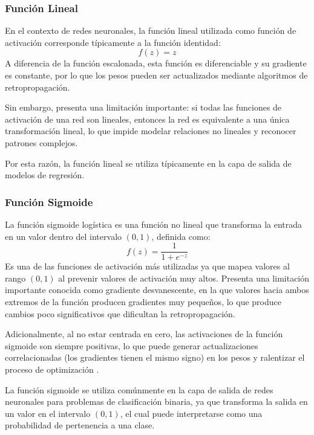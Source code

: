\subsubsection{Función Lineal}
En el contexto de redes neuronales, la función lineal utilizada como función de activación 
corresponde típicamente a la función identidad\parencite{DBLP:journals/corr/abs-2101-09957}:
\begin{equation}
    f(z) = z
\end{equation}
A diferencia de la función escalonada, esta función es diferenciable y su gradiente es 
constante, por lo que los pesos pueden ser actualizados mediante algoritmos de 
retropropagación.

Sin embargo, presenta una limitación importante: si todas las funciones de activación de 
una red son lineales, entonces la red es equivalente a una única transformación lineal, 
lo que impide modelar relaciones no lineales y reconocer patrones complejos.

Por esta razón, la función lineal se utiliza típicamente en la capa de salida de modelos 
de regresión.

\subsubsection{Función Sigmoide}
La función sigmoide logística es una función no lineal que transforma la entrada en un valor
dentro del intervalo $(0,1)$, definida como:
\begin{equation}
    f(z)=\frac{1}{1+e^{-z}}
\end{equation}
Es una de las funciones de activación más utilizadas ya que mapea valores al rango $(0,1)$
al prevenir valores de activación muy altos. Presenta una limitación importante conocida
como \guillemotleft gradiente desvanescente\guillemotright, en la que valores hacia ambos
extremos de la función producen gradientes muy pequeños, lo que produce cambios poco significativos
que dificultan la retropropagación.
\medskip

Adicionalmente, al no estar centrada en cero, las activaciones de la función sigmoide 
son siempre positivas, lo que puede generar actualizaciones correlacionadas (los gradientes
tienen el mismo signo) en los pesos y ralentizar el proceso de optimización \parencite{szandala2020review}.
\medskip

La función sigmoide se utiliza comúnmente en la capa de salida de redes neuronales
para problemas de clasificación binaria, ya que transforma la salida en un valor
en el intervalo $(0,1)$, el cual puede interpretarse como una probabilidad de
pertenencia a una clase.

